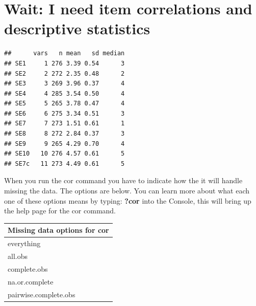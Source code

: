 \documentclass[
]{krantz}
\makeatletter
\newenvironment{Shaded}{\begin{snugshade}}{\end{snugshade}}
\newcommand{\DataTypeTok}[1]{\textcolor[rgb]{0.27,0.27,0.27}{#1}}
\newcommand{\DecValTok}[1]{\textcolor[rgb]{0.06,0.06,0.06}{#1}}
\newcommand{\KeywordTok}[1]{\textcolor[rgb]{0.27,0.27,0.27}{\textbf{#1}}}
\newcommand{\NormalTok}[1]{#1}
\newcommand{\OperatorTok}[1]{\textcolor[rgb]{0.43,0.43,0.43}{\textbf{#1}}}
\newcommand{\OtherTok}[1]{\textcolor[rgb]{0.37,0.37,0.37}{#1}}
\newcommand{\StringTok}[1]{\textcolor[rgb]{0.5,0.5,0.5}{#1}}
\newenvironment{kframe}{%
\medskip{}
\setlength{\fboxsep}{.8em}
 \def\at@end@of@kframe{}%
 \ifinner\ifhmode%
  \def\at@end@of@kframe{\end{minipage}}%
  \begin{minipage}{\columnwidth}%
 \fi\fi%
 \def\FrameCommand##1{\hskip\@totalleftmargin \hskip-\fboxsep
 \colorbox{shadecolor}{##1}\hskip-\fboxsep
     \hskip-\linewidth \hskip-\@totalleftmargin \hskip\columnwidth}%
 \MakeFramed {\advance\hsize-\width
   \@totalleftmargin\z@ \linewidth\hsize
   \@setminipage}}%
 {\par\unskip\endMakeFramed%
 \at@end@of@kframe}
\renewenvironment{Shaded}{\begin{kframe}}{\end{kframe}}
\makeatother
\begin{document}
\hypertarget{wait-i-need-item-correlations-and-descriptive-statistics}{%
\section{Wait: I need item correlations and descriptive statistics}\label{wait-i-need-item-correlations-and-descriptive-statistics}}

\begin{Shaded}
\end{Shaded}

\begin{verbatim}
##      vars   n mean   sd median
## SE1     1 276 3.39 0.54      3
## SE2     2 272 2.35 0.48      2
## SE3     3 269 3.96 0.37      4
## SE4     4 285 3.54 0.50      4
## SE5     5 265 3.78 0.47      4
## SE6     6 275 3.34 0.51      3
## SE7     7 273 1.51 0.61      1
## SE8     8 272 2.84 0.37      3
## SE9     9 265 4.29 0.70      4
## SE10   10 276 4.57 0.61      5
## SE7c   11 273 4.49 0.61      5
\end{verbatim}

When you run the cor command you have to indicate how the it will handle missing the data. The options are below. You can learn more about what each one of these options means by typing: \textbf{?cor} into the Console, this will bring up the help page for the cor command.

\begin{longtable}[]{@{}l@{}}
\toprule
Missing data options for cor\tabularnewline
\midrule
\endhead
everything\tabularnewline
all.obs\tabularnewline
complete.obs\tabularnewline
na.or.complete\tabularnewline
pairwise.complete.obs\tabularnewline
\bottomrule
\end{longtable}

\begin{Shaded}
\end{Shaded}
\end{document}
